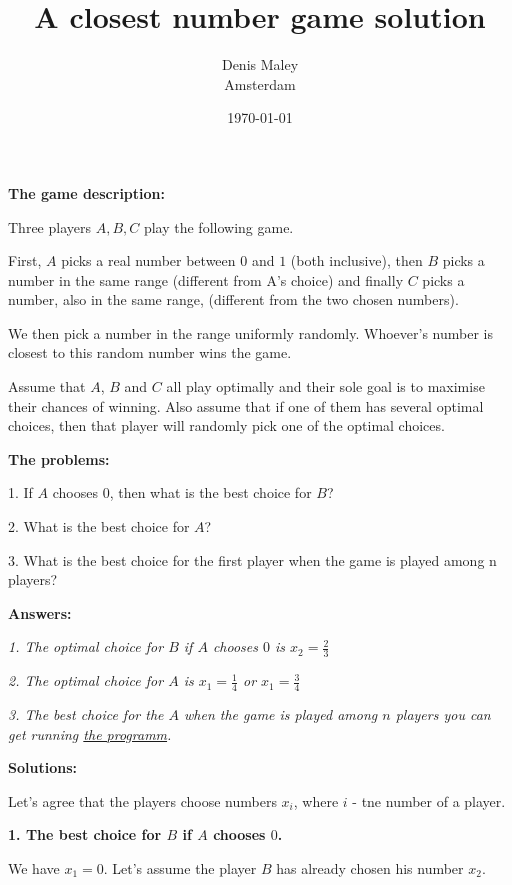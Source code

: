 \documentclass[12pt]{article}
\title{A closest number game solution}
\author{
Denis Maley  \\
Amsterdam  \\
}
\date{\today}
\begin{document}
\maketitle

\textbf{\large The game description:}

Three players $A, B, C$ play the following game. 

First, $A$ picks a real number between $0$ and $1$ (both inclusive),  
then $B$ picks a number in the same range (different from A’s choice) and  
finally $C$ picks a number, also in the same range, 
(different from the two chosen numbers). 

We then pick a number in the range uniformly randomly.  
Whoever’s number is closest to this random number wins the game. 

Assume that $A$, $B$ and $C$ all play optimally and their sole goal is to 
maximise their chances of winning. Also assume that if one of them has 
several optimal choices, then that player will randomly pick one of the 
optimal choices.

\bigskip

\textbf{\large The problems:}

1. If $A$ chooses $0$, then what is the best choice for $B$?

2. What is the best choice for $A$?

3. What is the best choice for the first player 
when the game is played among n players?

\bigskip

\textbf{\large Answers:}

\textit{
1. The optimal choice for $B$ if $A$ chooses $0$ is \boldmath$x_2 = \frac{2}{3}$
}

\textit{
2. The optimal choice for $A$ is \boldmath$x_1 = \frac{1}{4}$ or 
\boldmath$x_1 = \frac{3}{4}$
}

\textit{
3. The best choice for the $A$ when the game is played among $n$ players
you can get running 
\href{https://github.com/DenisMaley/closest-number-cli}{the programm}. 
}

\newpage
\textbf{\large Solutions:}

\bigskip

Let's agree that the players choose numbers $x_i$,
where $i$ - tne number of a player.

\bigskip

\textbf{1. The best choice for $B$ if $A$ chooses $0$.}


We have $x_1 = 0$.
Let's assume the player $B$ has already chosen his number $x_2$.
\end{document}
